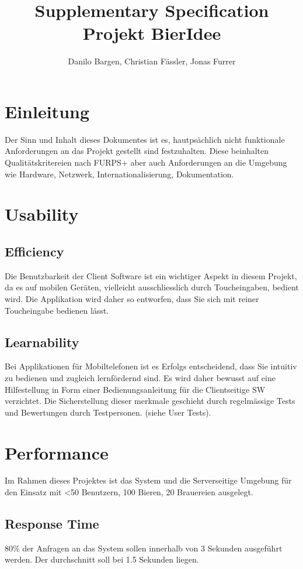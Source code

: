 \documentclass[10pt,a4paper]{scrartcl}
\author{Danilo Bargen, Christian Fässler, Jonas Furrer}
\title{Supplementary Specification \\Projekt BierIdee}
\subtitle{}
\begin{document}
\begin{titlepage}
	\maketitle
	\vspace{120mm}
	\thispagestyle{empty} %
\end{titlepage}



\section{Einleitung}

Der Sinn und Inhalt dieses Dokumentes ist es, hautpsächlich nicht funktionale Anforderungen an das Projekt gestellt sind festzuhalten. Diese beinhalten Qualitätskritereien nach FURPS+ aber auch Anforderungen an die Umgebung wie Hardware, Netzwerk, Internationalisierung, Dokumentation.

\section{Usability}
\subsection{Efficiency}
Die Benutzbarkeit der Client Software ist ein wichtiger Aspekt in diesem Projekt, da es auf mobilen Geräten, vielleicht ausschliesslich durch Toucheingaben, bedient wird. Die Applikation wird daher so entworfen, dass Sie sich mit reiner Toucheingabe bedienen lässt.
\subsection{Learnability}
Bei Applikationen für Mobiltelefonen ist es Erfolgs entscheidend, dass Sie intuitiv zu bedienen und zugleich lernfördernd sind. Es wird daher bewusst auf eine Hilfestellung in Form einer Bedienungsanleitung für die Clientseitige SW verzichtet. Die Sicherstellung dieser merkmale geschieht durch regelmässige Tests und Bewertungen durch Testpersonen. (siehe User Tests).

\section{Performance}
Im Rahmen dieses Projektes ist das System und die Serverseitige Umgebung für den Einsatz mit <50 Benutzern, 100 Bieren, 20 Brauereien ausgelegt.
\subsection{Response Time}
80\% der Anfragen an das System sollen innerhalb von 3 Sekunden ausgeführt werden.
Der durchschnitt soll bei 1.5 Sekunden liegen.
\end{document}

